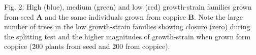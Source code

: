 Fig. 2: High (blue), medium (green) and low (red) growth-strain families grown from seed \textbf{A} and the same individuals grown from coppice \textbf{B}. Note the large number of trees in the low growth-strain families showing closure (zero) during the splitting test and the higher magnitudes of growth-strain when grown form coppice (\~200 plants from seed and \~200 from coppice).